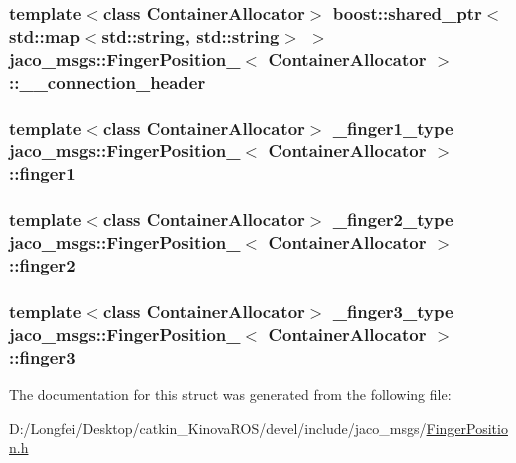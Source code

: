 \subsubsection[{\texorpdfstring{\+\_\+\+\_\+connection\+\_\+header}{__connection_header}}]{\setlength{\rightskip}{0pt plus 5cm}template$<$class Container\+Allocator$>$ boost\+::shared\+\_\+ptr$<$std\+::map$<$std\+::string, std\+::string$>$ $>$ {\bf jaco\+\_\+msgs\+::\+Finger\+Position\+\_\+}$<$ Container\+Allocator $>$\+::\+\_\+\+\_\+connection\+\_\+header}\hypertarget{structjaco__msgs_1_1FingerPosition___ab85e7311b4ade23eed568a21589ae12f}{}\label{structjaco__msgs_1_1FingerPosition___ab85e7311b4ade23eed568a21589ae12f}
\subsubsection[{\texorpdfstring{finger1}{finger1}}]{\setlength{\rightskip}{0pt plus 5cm}template$<$class Container\+Allocator$>$ {\bf \+\_\+finger1\+\_\+type} {\bf jaco\+\_\+msgs\+::\+Finger\+Position\+\_\+}$<$ Container\+Allocator $>$\+::finger1}\hypertarget{structjaco__msgs_1_1FingerPosition___a5e08265efb8023ba04d99d556e186b14}{}\label{structjaco__msgs_1_1FingerPosition___a5e08265efb8023ba04d99d556e186b14}
\subsubsection[{\texorpdfstring{finger2}{finger2}}]{\setlength{\rightskip}{0pt plus 5cm}template$<$class Container\+Allocator$>$ {\bf \+\_\+finger2\+\_\+type} {\bf jaco\+\_\+msgs\+::\+Finger\+Position\+\_\+}$<$ Container\+Allocator $>$\+::finger2}\hypertarget{structjaco__msgs_1_1FingerPosition___a7dcdd9f48dc0ff847c0170a096038917}{}\label{structjaco__msgs_1_1FingerPosition___a7dcdd9f48dc0ff847c0170a096038917}
\subsubsection[{\texorpdfstring{finger3}{finger3}}]{\setlength{\rightskip}{0pt plus 5cm}template$<$class Container\+Allocator$>$ {\bf \+\_\+finger3\+\_\+type} {\bf jaco\+\_\+msgs\+::\+Finger\+Position\+\_\+}$<$ Container\+Allocator $>$\+::finger3}\hypertarget{structjaco__msgs_1_1FingerPosition___abb7ec1eff7489809a20c32b8ea19386b}{}\label{structjaco__msgs_1_1FingerPosition___abb7ec1eff7489809a20c32b8ea19386b}


The documentation for this struct was generated from the following file\+:\begin{DoxyCompactItemize}
\item 
D\+:/\+Longfei/\+Desktop/catkin\+\_\+\+Kinova\+R\+O\+S/devel/include/jaco\+\_\+msgs/\hyperlink{FingerPosition_8h}{Finger\+Position.\+h}\end{DoxyCompactItemize}
